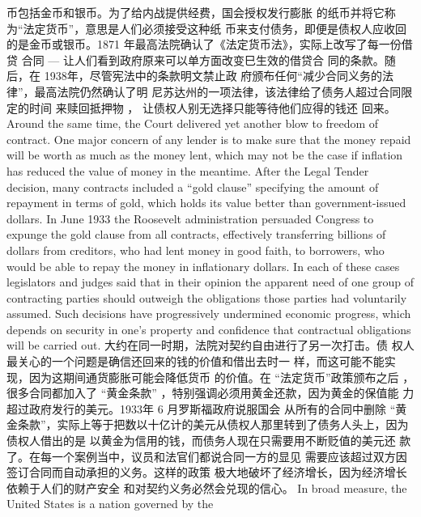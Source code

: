 \begin{paracol}{2}
币包括金币和银币。为了给内战提供经费，国会授权发行膨胀
的纸币并将它称为“法定货币”，意思是人们必须接受这种纸
币来支付债务，即便是债权人应收回的是金币或银币。1871
年最高法院确认了《法定货币法》，实际上改写了每一份借贷
合同 --- 让人们看到政府原来可以单方面改变巳生效的借贷合
同的条款。随后，在 1938年，尽管宪法中的条款明文禁止政
府颁布任何“减少合同义务的法律”，最高法院仍然确认了明
尼苏达州的一项法律，该法律给了债务人超过合同限定的时间
来赎回抵押物 ， 让债权人别无选择只能等待他们应得的钱还
回来。
\switchcolumn*
Around the same time, the Court delivered yet another blow
to freedom of contract. One major concern of any lender is to
make sure that the money repaid will be worth as much as the
money lent, which may not be the case if inflation has reduced
the value of money in the meantime. After the Legal Tender decision, many contracts included a ``gold clause'' specifying the
amount of repayment in terms of gold, which holds its value
better than government-issued dollars. In June 1933 the Roosevelt administration persuaded Congress to expunge the gold
clause from all contracts, effectively transferring billions of dollars from creditors, who had lent money in good faith, to borrowers, who would be able to repay the money in inflationary
dollars. In each of these cases legislators and judges said that in
their opinion the apparent need of one group of contracting
parties should outweigh the obligations those parties had voluntarily assumed. Such decisions have progressively undermined economic progress, which depends on security in one's
property and confidence that contractual obligations will be
carried out.
\switchcolumn
大约在同一时期，法院对契约自由进行了另一次打击。债
权人最关心的一个问题是确信还回来的钱的价值和借出去时一
样，而这可能不能实现，因为这期间通货膨胀可能会降低货币
的价值。在 “法定货币”政策颁布之后 ， 很多合同都加入了
“黄金条款” ，特别强调必须用黄金还款，因为黄金的保值能
力超过政府发行的美元。1933年 6 月罗斯福政府说服国会
从所有的合同中删除 “黄金条款”，实际上等于把数以十亿计的美元从债权人那里转到了债务人头上，因为债权人借出的是
以黄金为信用的钱，而债务人现在只需要用不断贬值的美元还
款了。在每一个案例当中，议员和法官们都说合同一方的显见
需要应该超过双方因签订合同而自动承担的义务。这样的政策
极大地破坏了经济增长，因为经济增长依赖于人们的财产安全
和对契约义务必然会兑现的信心。
In broad measure, the United States is a nation governed by the

\end{paracol}
